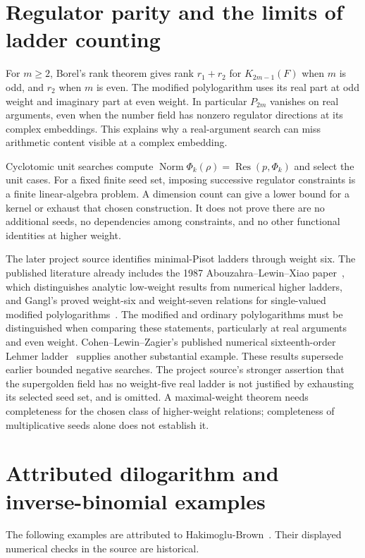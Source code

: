 \section{Regulator parity and the limits of ladder counting}
For $m\ge2$, Borel's rank theorem gives rank $r_1+r_2$ for
$K_{2m-1}(F)$ when $m$ is odd, and $r_2$ when $m$ is even.
The modified polylogarithm uses its real part at odd weight and imaginary
part at even weight. In particular $P_{2m}$ vanishes on real arguments,
even when the number field has nonzero regulator directions at its complex
embeddings. This explains why a real-argument search can miss arithmetic
content visible at a complex embedding.

Cyclotomic unit searches compute
$\operatorname{Norm}\Phi_k(\rho)=\operatorname{Res}(p,\Phi_k)$ and select
the unit cases. For a fixed finite seed set, imposing successive regulator
constraints is a finite linear-algebra problem. A dimension count can give
a lower bound for a kernel or exhaust that chosen construction. It does
not prove there are no additional seeds, no dependencies among constraints,
and no other functional identities at higher weight.

The later project source identifies minimal-Pisot ladders through
weight six. The published literature already includes the 1987
Abouzahra--Lewin--Xiao paper~\cite{golden:AbouzahraLewinXiao1987},
which distinguishes analytic low-weight results from numerical higher
ladders, and Gangl's proved weight-six and weight-seven relations for
single-valued modified polylogarithms~\cite{golden:Gangl2013}.
The modified and ordinary polylogarithms must be distinguished when
comparing these statements, particularly at real arguments and even
weight. Cohen--Lewin--Zagier's published numerical sixteenth-order
Lehmer ladder~\cite{CohenLewinZagier} supplies another substantial example.
These results supersede earlier bounded negative searches. The project
source's stronger assertion that the supergolden field has no weight-five
real ladder is not justified by exhausting its selected seed set, and
is omitted. A maximal-weight theorem needs completeness for the chosen
class of higher-weight relations; completeness of multiplicative seeds
alone does not establish it.

\section{Attributed dilogarithm and inverse-binomial examples}\label{sec:dilog-examples}
The following examples are attributed to Hakimoglu-Brown~\cite{HakimogluBrown}. Their displayed numerical checks in the source are historical.

